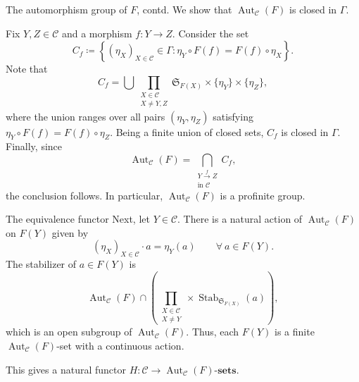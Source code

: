 \documentclass{beamer}
\newcommand{\frakS}{\mathfrak{S}} %
\newcommand{\sets}[1]{#1\text{-}\mathbf{sets}}
\newcommand{\Aut}{\operatorname{Aut}}
\newcommand{\scrC}{\mathscr{C}} %
\newcommand{\Stab}{\operatorname{Stab}}
\begin{document}
\begin{frame}{The automorphism group of $F$, contd.}
	We show that $\Aut_{\scrC}(F)$ is closed in $\Gamma$. \pause 

	Fix $Y,Z\in\scrC$ and a morphism $f: Y\to Z$. Consider the set 
	\begin{equation*}
		C_f\coloneq\left\{\left(\eta_X\right)_{X\in\scrC}\in\Gamma\colon \eta_Y\circ F(f) = F(f)\circ\eta_X\right\}.
	\end{equation*} \pause 
	Note that 
	\begin{equation*}
		C_f = \bigcup\prod_{\substack{X\in\scrC\\ X\ne Y, Z}}\frakS_{F(X)}\times\{\eta_Y\}\times\{\eta_Z\},
	\end{equation*} 
	where the union ranges over all pairs $(\eta_Y,\eta_Z)$ satisfying $\eta_Y\circ F(f) = F(f)\circ\eta_Z$.  \pause 
	Being a finite union of closed sets, $C_f$ is closed in $\Gamma$. \pause 
	Finally, since
	\begin{equation*}
		\Aut_{\scrC}(F) = \bigcap_{\substack{Y\xrightarrow{f}Z\\\text{in }\scrC}} C_f,
	\end{equation*}
	the conclusion follows. \pause 
	In particular, $\Aut_{\scrC}(F)$ is a profinite group. 
\end{frame}

\begin{frame}{The equivalence functor}
	Next, let $Y\in\scrC$. There is a natural action of $\Aut_{\scrC}(F)$ on $F(Y)$ given by 
	\begin{equation*}
		\left(\eta_X\right)_{X\in\scrC}\cdot a = \eta_Y(a)\qquad \forall~a\in F(Y).
	\end{equation*} \pause 
	The stabilizer of $a\in F(Y)$ is 
	\begin{equation*}
		\Aut_{\scrC}(F)\cap\left(\prod_{\substack{X\in\scrC\\ X\ne Y}}\times\Stab_{\frakS_{F(X)}}(a)\right),
	\end{equation*}
	which is an open subgroup of $\Aut_{\scrC}(F)$. \pause 
	Thus, each $F(Y)$ is a finite $\Aut_{\scrC}(F)$-set with a continuous action. \pause 
	
	This gives a natural functor $H: \scrC\to\sets{\Aut_{\scrC}(F)}$.
\end{frame}
\end{document}
